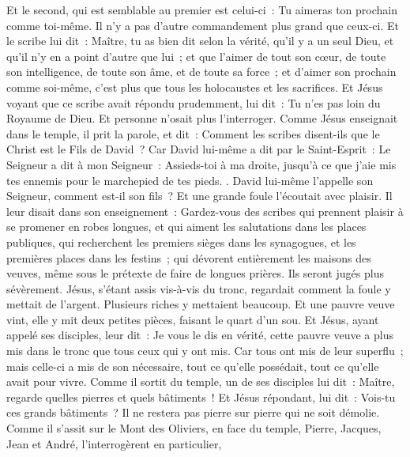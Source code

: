 \begin{multicols}{2}
Et le second, qui est semblable au premier est celui-ci~: Tu aimeras ton prochain comme toi-même. Il n'y a pas d'autre commandement plus grand que ceux-ci.
Et le scribe lui dit~: Maître, tu as bien dit selon la vérité, qu'il y a un seul Dieu, et qu'il n'y en a point d'autre que lui~;
et que l'aimer de tout son cœur, de toute son intelligence, de toute son âme, et de toute sa force~; et d'aimer son prochain comme soi-même, c'est plus que tous les holocaustes et les sacrifices.
Et Jésus voyant que ce scribe avait répondu prudemment, lui dit~: Tu n'es pas loin du Royaume de Dieu. Et personne n'osait plus l'interroger.
Comme Jésus enseignait dans le temple, il prit la parole, et dit~: Comment les scribes disent-ils que le Christ est le Fils de David~?
Car David lui-même a dit par le Saint-Esprit~: Le Seigneur a dit à mon Seigneur~: Assieds-toi à ma droite, jusqu’à ce que j'aie mis tes ennemis pour le marchepied de tes pieds.
.
David lui-même l'appelle son Seigneur, comment est-il son fils~? Et une grande foule l'écoutait avec plaisir.
Il leur disait dans son enseignement~: Gardez-vous des scribes qui prennent plaisir à se promener en robes longues, et qui aiment les salutations dans les places publiques,
qui recherchent les premiers sièges dans les synagogues, et les premières places dans les festins~;
qui dévorent entièrement les maisons des veuves, même sous le prétexte de faire de longues prières. Ils seront jugés plus sévèrement.
Jésus, s'étant assis vis-à-vis du tronc, regardait comment la foule y mettait de l'argent. Plusieurs riches y mettaient beaucoup.
Et une pauvre veuve vint, elle y mit deux petites pièces, faisant le quart d'un sou.
Et Jésus, ayant appelé ses disciples, leur dit~: Je vous le dis en vérité, cette pauvre veuve a plus mis dans le tronc que tous ceux qui y ont mis.
Car tous ont mis de leur superflu~; mais celle-ci a mis de son nécessaire, tout ce qu'elle possédait, tout ce qu'elle avait pour vivre.
\VerseOne{}Comme il sortit du temple, un de ses disciples lui dit~: Maître, regarde quelles pierres et quels bâtiments~!
Et Jésus répondant, lui dit~: Vois-tu ces grands bâtiments~? Il ne restera pas pierre sur pierre qui ne soit démolie.
Comme il s'assit sur le Mont des Oliviers, en face du temple, Pierre, Jacques, Jean et André, l'interrogèrent en particulier,

\end{multicols}
